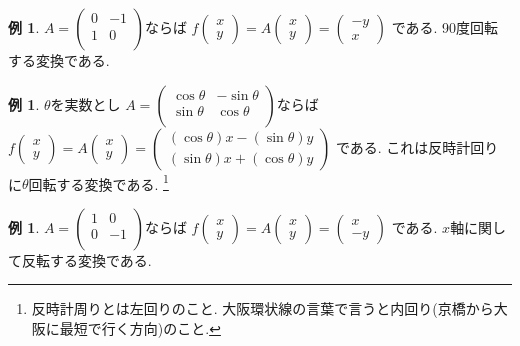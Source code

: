 \documentclass[dvipdfmx,a4paper,11pt]{article}
\theoremstyle{definition}
\newtheorem{exa}[thm]{例}
\begin{document}
  \begin{exa}
$
A=\begin{pmatrix}
0& -1\\
1& 0 \\
\end{pmatrix}
$ならば
$
f\begin{pmatrix}
x \\ y
 \end{pmatrix} 
 =
 A
\begin{pmatrix}
x \\ y
 \end{pmatrix}  = 
 \begin{pmatrix}
-y \\x
 \end{pmatrix}
$
である. 90度回転する変換である.
\end{exa}
 
   \begin{exa}$\theta$を実数とし
$
A=\begin{pmatrix}
\cos \theta & -\sin \theta\\
\sin \theta& \cos \theta  \\
\end{pmatrix}
$ならば
$
f\begin{pmatrix}
x \\ y
 \end{pmatrix} 
 =
 A
\begin{pmatrix}
x \\ y
 \end{pmatrix}  = 
 \begin{pmatrix}
(\cos \theta ) x - (\sin \theta )y \\
(\sin \theta ) x + (\cos \theta )y 
 \end{pmatrix}
$
である. これは反時計回りに$\theta$回転する変換である. \footnote{反時計周りとは左回りのこと. 大阪環状線の言葉で言うと内回り(京橋から大阪に最短で行く方向)のこと. }
\end{exa}
 
 \begin{exa}
$
A=\begin{pmatrix}
1& 0 \\
0& -1 \\
\end{pmatrix}
$ならば
$
f\begin{pmatrix}
x \\ y
 \end{pmatrix} 
 =
 A
\begin{pmatrix}
x \\ y
 \end{pmatrix}  = 
 \begin{pmatrix}
x \\-y
 \end{pmatrix}
$
である. $x$軸に関して反転する変換である. 
\end{exa}
 
\end{document}
